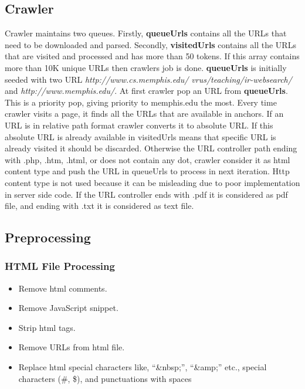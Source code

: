 \label{sec:implementation}
\subsection{Crawler}
Crawler maintains two queues. Firstly, \textbf{queueUrls} contains all the URLs that need to be
downloaded and parsed. Secondly, \textbf{visitedUrls} contains all the URLs that are visited and
processed and has more than 50 tokens. If this array contains more than 10K unique URLs then
crawlers job is done. \textbf{queueUrls} is initially seeded with two URL \textit{http://www.cs.memphis.edu/
vrus/teaching/ir-websearch/} and \textit{http://www.memphis.edu/}. At first crawler pop an URL from
\textbf{queueUrls}. This is a priority pop, giving priority to memphis.edu the most. Every time crawler visits a page, it finds all the URLs that are available in anchors. If an URL is in relative path format crawler converts it to absolute URL. If this absolute URL is already available in visitedUrls means that specific URL is already visited it should be discarded. Otherwise the URL controller path ending with .php, .htm, .html, or does not contain any dot, crawler consider
it as html content type and push the URL in queueUrls to process in next iteration. Http content
type is not used because it can be misleading due to poor implementation in server side code. If
the URL controller ends with .pdf it is considered as pdf file, and ending with .txt it is considered as text file.

\subsection{Preprocessing}
\subsubsection{HTML File Processing}
\begin{itemize}
\item Remove html comments.
\item Remove JavaScript snippet.
\item Strip html tags.
\item Remove URLs from html file.
\item Replace html special characters like, “\&nbsp;”, “\&amp;” etc., special characters (\#, \$), and punctuations with spaces
\end{itemize}


